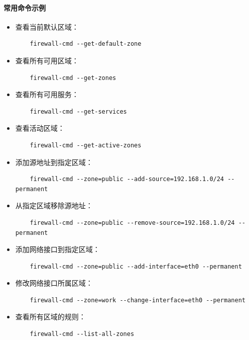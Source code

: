 \documentclass[12pt,UTF8]{ctexbook}
\begin{document}
\paragraph{常用命令示例}

\begin{itemize}
    \item 查看当前默认区域：
    \begin{verbatim}
    firewall-cmd --get-default-zone
    \end{verbatim}
    
    \item 查看所有可用区域：
    \begin{verbatim}
    firewall-cmd --get-zones
    \end{verbatim}
    
    \item 查看所有可用服务：
    \begin{verbatim}
    firewall-cmd --get-services
    \end{verbatim}
    
    \item 查看活动区域：
    \begin{verbatim}
    firewall-cmd --get-active-zones
    \end{verbatim}
    
    \item 添加源地址到指定区域：
    \begin{verbatim}
    firewall-cmd --zone=public --add-source=192.168.1.0/24 --permanent
    \end{verbatim}
    
    \item 从指定区域移除源地址：
    \begin{verbatim}
    firewall-cmd --zone=public --remove-source=192.168.1.0/24 --permanent
    \end{verbatim}
    
    \item 添加网络接口到指定区域：
    \begin{verbatim}
    firewall-cmd --zone=public --add-interface=eth0 --permanent
    \end{verbatim}
    
    \item 修改网络接口所属区域：
    \begin{verbatim}
    firewall-cmd --zone=work --change-interface=eth0 --permanent
    \end{verbatim}
    
    \item 查看所有区域的规则：
    \begin{verbatim}
    firewall-cmd --list-all-zones
    \end{verbatim}
    

\end{itemize}
\end{document}
